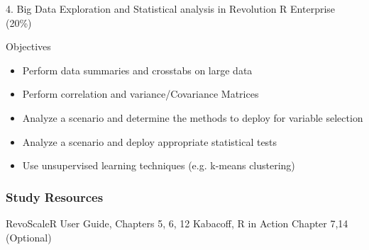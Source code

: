 4. Big Data Exploration and Statistical analysis in Revolution R Enterprise (20\%)

Objectives

\begin{itemize}
\item Perform data summaries and crosstabs on large data
\item Perform correlation and variance/Covariance Matrices
\item Analyze a scenario and determine the methods to deploy for variable selection
\item Analyze a scenario and deploy appropriate statistical tests
\item Use unsupervised learning techniques (e.g. k-means clustering)
\end{itemize}

\subsubsection{Study Resources}

RevoScaleR User Guide, Chapters 5, 6, 12
Kabacoff, R in Action Chapter 7,14 (Optional)

